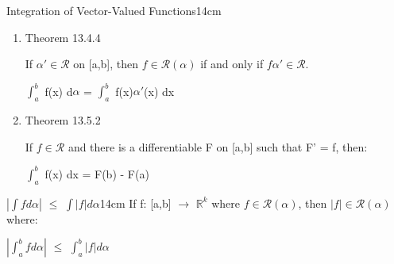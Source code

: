 \begin{definition}{Integration of Vector-Valued Functions}{14cm}
\begin{enumerate}[label=(\alph*), leftmargin=1.5cm, itemsep=0.1cm]
                \hspace{0.5cm}
                $f \in \mathscr{R}(c\alpha_1)$ with
                $\int_a^b$ f d$(c\alpha_1)$
                = $c \int_a^b$ f d$\alpha_1$

            \item {\color{red} Theorem 13.4.4}

                If $\alpha' \in \mathscr{R}$ on [a,b], then
                $f \in \mathscr{R}(\alpha)$ if and only if $f\alpha' \in \mathscr{R}$.

                \hspace{0.5cm}
                $\int_a^b$ f(x) d$\alpha$ = $\int_a^b$ f(x)$\alpha'$(x) dx

            \item {\color{red} Theorem 13.5.2}
            
                If $f \in \mathscr{R}$ and there is a differentiable F
                on [a,b] such that F' = f, then:

                \hspace{0.5cm}
                $\int_a^b$ f(x) dx = F(b) - F(a)
        \end{enumerate}        
    \end{definition}

    \vspace{0.5cm}



    \begin{wtheorem}{$|\int f d\alpha|$ $\leq$ $\int |f| d\alpha$}{14cm}
        If f: [a,b] $\rightarrow$ $\mathbb{R}^k$ where $f \in \mathscr{R}(\alpha)$,
        then $|f| \in \mathscr{R}(\alpha)$ where:

        \hspace{0.5cm}
        $|\int_a^b f d\alpha|$ $\leq$ $\int_a^b |f| d\alpha$        
    \end{wtheorem}
    
